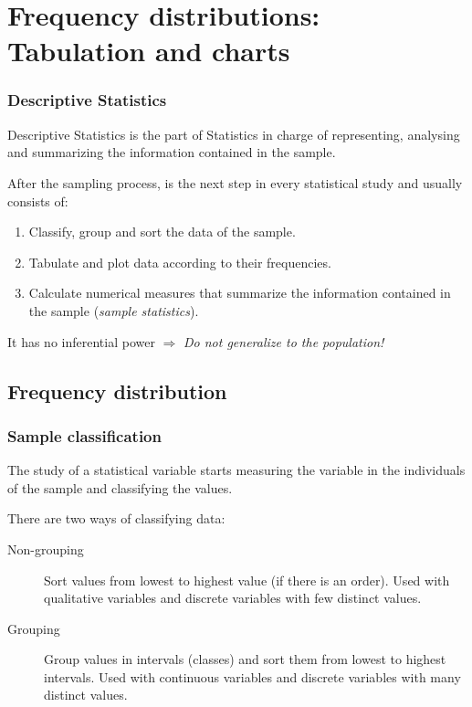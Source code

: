 \section{Frequency distributions: Tabulation and charts}



\begin{frame} 
\frametitle{Descriptive Statistics}
Descriptive Statistics is the part of Statistics in charge of representing, analysing and summarizing the information
contained in the sample.

After the sampling process, is the next step in every statistical study and usually consists of:
\begin{enumerate}
\item Classify, group and sort the data of the sample.
\item Tabulate and plot data according to their frequencies.
\item Calculate numerical measures that summarize the information contained in the sample (\emph{sample statistics}).
\end{enumerate} 

It has no inferential power $\Rightarrow$ \alert{\emph{Do not generalize to the population!}} 
\end{frame}


\subsection{Frequency distribution}
\begin{frame}
\frametitle{Sample classification}
The study of a statistical variable starts measuring the variable in the individuals of the sample and classifying the
values.

There are two ways of classifying data:
\begin{description}
\item[Non-grouping] Sort values from lowest to highest value (if there is an order).
Used with qualitative variables and discrete variables with few distinct values.
\item[Grouping] Group values in intervals (classes) and sort them from lowest to highest intervals. 
Used with continuous variables and discrete variables with many distinct values. 
\end{description}
\end{frame}


